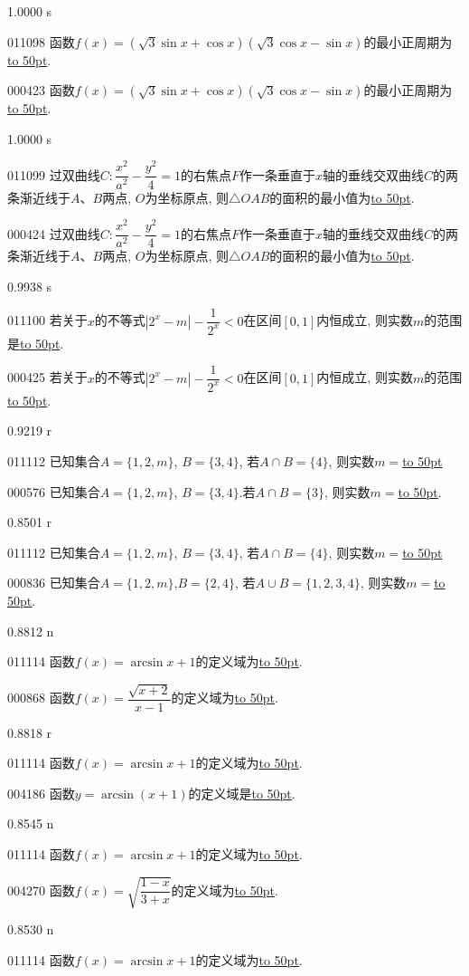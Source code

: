 \documentclass[10pt,a4paper]{article}
\newcommand{\blank}[1]{\underline{\hbox to #1pt{}}}
\begin{document}
1.0000 s

011098	函数$f(x)=(\sqrt 3\sin x+\cos x)(\sqrt 3\cos x-\sin x)$的最小正周期为\blank{50}.

000423	函数$f(x)=(\sqrt3\sin x+\cos x)(\sqrt3\cos x-\sin x)$的最小正周期为\blank{50}.

1.0000 s

011099	过双曲线$C:\dfrac{x^2}{a^2}-\dfrac{y^2}4=1$的右焦点$F$作一条垂直于$x$轴的垂线交双曲线$C$的两条渐近线于$A$、$B$两点, $O$为坐标原点, 则$\triangle OAB$的面积的最小值为\blank{50}.

000424	过双曲线$C:\dfrac{x^2}{a^2}-\dfrac{y^2}4=1$的右焦点$F$作一条垂直于$x$轴的垂线交双曲线$C$的两条渐近线于$A$、$B$两点, $O$为坐标原点, 则$\triangle OAB$的面积的最小值为\blank{50}.

0.9938 s

011100	若关于$x$的不等式$|2^x-m|-\dfrac 1{2^x}<0$在区间$[0,1]$内恒成立, 则实数$m$的范围是\blank{50}.

000425	若关于$x$的不等式$|2^x-m|-\dfrac1{2^x}<0$在区间$[0,1]$内恒成立, 则实数$m$的范围\blank{50}.

0.9219 r

011112	已知集合$A=\{1,2,m\}$, $B=\{3,4\}$, 若$A\cap B=\{4\}$, 则实数$m=$\blank{50}

000576	已知集合$A=\{1,2,m\}$, $B=\{3,4\}$.若$A\cap B=\{3\}$, 则实数$m=$\blank{50}.

0.8501 r

011112	已知集合$A=\{1,2,m\}$, $B=\{3,4\}$, 若$A\cap B=\{4\}$, 则实数$m=$\blank{50}

000836	已知集合$A=\{1,2,m\}$,$B=\{2,4\}$, 若$A\cup B=\{1,2,3,4\}$, 则实数$m=$\blank{50}.

0.8812 n

011114	函数$f(x)=\arcsin x+1$的定义域为\blank{50}.

000868	函数$f(x)=\dfrac{\sqrt{x+2}}{x-1}$的定义域为\blank{50}.

0.8818 r

011114	函数$f(x)=\arcsin x+1$的定义域为\blank{50}.

004186	函数$y=\arcsin (x+1)$的定义域是\blank{50}.

0.8545 n

011114	函数$f(x)=\arcsin x+1$的定义域为\blank{50}.

004270	函数$f(x)=\sqrt{\dfrac{1-x}{3+x}}$的定义域为\blank{50}.

0.8530 n

011114	函数$f(x)=\arcsin x+1$的定义域为\blank{50}.
\end{document}
